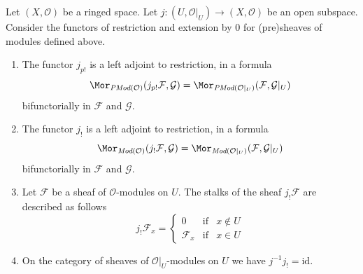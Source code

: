 \begin{lemma}
\label{lemma-j-shriek-modules}
Let $(X, \mathcal{O})$ be a ringed space.
Let $j : (U, \mathcal{O}|_U) \to (X, \mathcal{O})$
be an open subspace.
Consider the functors of restriction and extension
by $0$ for (pre)sheaves of modules defined above.
\begin{enumerate}
\item The functor $j_{p!}$ is a left adjoint to restriction,
in a formula
$$
\Mor_{\textit{PMod}(\mathcal{O})}(j_{p!}\mathcal{F}, \mathcal{G})
=
\Mor_{\textit{PMod}(\mathcal{O}|_U)}(\mathcal{F}, \mathcal{G}|_U)
$$
bifunctorially in $\mathcal{F}$ and $\mathcal{G}$.
\item The functor $j_!$ is a left adjoint to restriction,
in a formula
$$
\Mor_{\textit{Mod}(\mathcal{O})}(j_!\mathcal{F}, \mathcal{G})
=
\Mor_{\textit{Mod}(\mathcal{O}|_U)}(\mathcal{F}, \mathcal{G}|_U)
$$
bifunctorially in $\mathcal{F}$ and $\mathcal{G}$.
\item Let $\mathcal{F}$ be a sheaf of $\mathcal{O}$-modules on $U$.
The stalks of the sheaf $j_!\mathcal{F}$ are described
as follows
$$
j_{!}\mathcal{F}_x =
\left\{
\begin{matrix}
0 & \text{if} & x \not \in U \\
\mathcal{F}_x & \text{if} & x \in U
\end{matrix}
\right.
$$
\item On the category of sheaves of $\mathcal{O}|_U$-modules on $U$
we have $j^{-1}j_! = \text{id}$.
\end{enumerate}
\end{lemma}